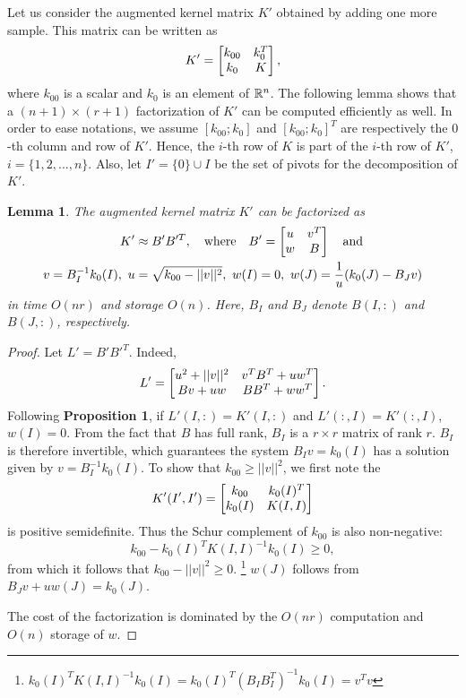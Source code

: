 \documentclass[12pt,letterpaper]{article}
\newtheorem{lemma}{Lemma}
\begin{document}
Let us consider the augmented
kernel matrix  $K'$ obtained by adding one more sample. This matrix
can be written as
\begin{equation}
K'=\left[\begin{matrix}k_{00} & k_0^T\\k_0& K\end{matrix}\right],
\end{equation}
where $k_{00}$ is a scalar and $k_0$ is an element of $\mathbb{R}^n$.
The following
lemma shows that a $(n+1)\times (r+1)$ factorization of $K'$ can
be computed efficiently as well. In order to ease notations, we assume $[k_{00}; k_0]$ and $[k_{00}; k_0]^T$ are respectively the $0$-th column and row of $K'$. Hence, the $i$-th row of $K$ is part of the $i$-th row of $K'$, $i=\{1,2,...,n\}$. Also, let $I'=\{0\}\cup I$ be the set of pivots for the decomposition of $K'$.

\begin{lemma}
The augmented kernel matrix $K'$ can be factorized as
\begin{align}
K'&\approx B'B'^T,\quad\text{where}\quad
B'=\left[\begin{matrix}u & v^T\\w & B\end{matrix}\right]\quad\text{and}\\
v=B_I^{-1} k_0(I),\,\, u&=\sqrt{k_{00}-||v||^2},\,\, w(I) = 0,\,\, w(J)=\dfrac{1}{u}(k_0(J)-B_Jv)
\end{align}
in time $O(nr)$ and storage $O(n)$. Here, $B_I$ and $B_J$ denote $B(I,:)$ and $B(J,:)$, respectively.
\end{lemma}
\begin{proof}
Let $L' = B'B'^T$. Indeed, 
\begin{equation}
L'=\left[\begin{matrix}u^2+||v||^2 & v^TB^T+uw^T\\ Bv+uw & BB^T+ww^T\end{matrix}\right]. 
\end{equation}
Following \textbf{Proposition 1}, if $L'(I,:)=K'(I,:)$ and $L'(:,I)=K'(:,I)$, $w(I)=0$.
From the fact that $B$ has full rank, $B_I$ is a $r\times r$ matrix of rank $r$.
$B_I$ is therefore invertible, which guarantees the system $B_Iv=k_0(I)$ has a solution given by $v=B_I^{-1} k_0(I)$.
To show that $k_{00}\ge ||v||^2$, we first note the 
\begin{equation}
K'(I',I') = \left[\begin{matrix}k_{00} & k_0(I)^T\\ k_0(I)& K(I,I)\end{matrix}\right]
\end{equation}
is positive semidefinite. Thus the Schur complement of $k_{00}$ is also non-negative:
\begin{equation}
k_{00}-k_0(I)^TK(I,I)^{-1}k_0(I)\ge 0,
\end{equation}
from which it follows that $k_{00}-||v||^2\ge 0$. \footnote{$k_0(I)^TK(I,I)^{-1}k_0(I)=k_0(I)^T(B_IB_I^T)^{-1}k_0(I)=v^Tv$}
$w(J)$ follows from $B_Jv+uw(J)=k_0(J).$

The cost of the factorization is dominated by the $O(nr)$ computation and $O(n)$ storage
of $w$.
\end{proof}
\end{document}
